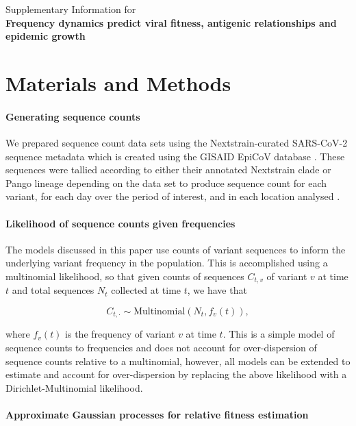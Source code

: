 \documentclass[12pt,oneside,letterpaper]{article}
\begin{document}
\begin{center}\Large
Supplementary Information for \\
\bf Frequency dynamics predict viral fitness, antigenic relationships and epidemic growth
\end{center}

\section*{Materials and Methods}

\paragraph{Generating sequence counts}

We prepared sequence count data sets using the Nextstrain-curated SARS-CoV-2 sequence metadata \cite{Hadfield2018} which is created using the GISAID EpiCoV database \cite{khare2021gisaid}.
These sequences were tallied according to either their annotated Nextstrain clade or Pango lineage depending on the data set to produce sequence count for each variant, for each day over the period of interest, and in each location analysed \cite{aksamentov2021nextclade}.


\paragraph{Likelihood of sequence counts given frequencies}

The models discussed in this paper use counts of variant sequences to inform the underlying variant frequency in the population.
This is accomplished using a multinomial likelihood, so that given counts of sequences $C_{t,v}$ of variant $v$ at time $t$ and total sequences $N_{t}$ collected at time $t$, we have that

\begin{equation*}
    C_{t, \cdot} \sim \text{Multinomial}(N_{t}, f_{v}(t)),
\end{equation*}

where $f_{v}(t)$ is the frequency of variant $v$ at time $t$.
This is a simple model of sequence counts to frequencies and does not account for over-dispersion of sequence counts relative to a multinomial, however, all models can be extended to estimate and account for over-dispersion by replacing the above likelihood with a Dirichlet-Multinomial likelihood.

\paragraph{Approximate Gaussian processes for relative fitness estimation}%
\end{document}
